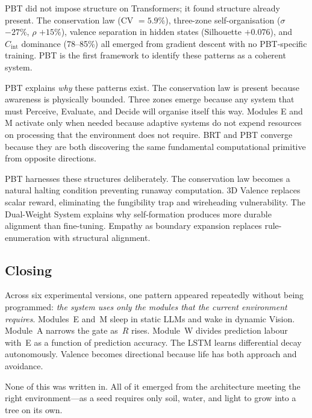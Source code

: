 \documentclass[12pt,a4paper]{article}
\newcommand{\Cint}{C_{\mathrm{int}}}
\newcommand{\pp}[1]{\textbf{#1}}
\begin{document}
\begin{description}[leftmargin=1.4em]
  \item[\pp{Layer~1 --- Reveal:}]
    PBT did not impose structure on Transformers; it found structure already
    present. The conservation law (CV $= 5.9\%$), three-zone
    self-organisation ($\sigma$ $-27\%$, $\rho$ $+15\%$), valence separation
    in hidden states (Silhouette $+0.076$), and $\Cint$ dominance (78--85\%)
    all emerged from gradient descent with no PBT-specific training. PBT is
    the first framework to identify these patterns as a coherent system.
  \item[\pp{Layer~2 --- Interpret:}]
    PBT explains \emph{why} these patterns exist. The conservation law is
    present because awareness is physically bounded. Three zones emerge because
    any system that must Perceive, Evaluate, and Decide will organise itself
    this way. Modules E and M activate only when needed because adaptive
    systems do not expend resources on processing that the environment does not
    require. BRT and PBT converge because they are both discovering the same
    fundamental computational primitive from opposite directions.
  \item[\pp{Layer~3 --- Control:}]
    PBT harnesses these structures deliberately. The conservation law becomes
    a natural halting condition preventing runaway computation. 3D Valence
    replaces scalar reward, eliminating the fungibility trap and wireheading
    vulnerability. The Dual-Weight System explains why self-formation produces
    more durable alignment than fine-tuning. Empathy as boundary expansion
    replaces rule-enumeration with structural alignment.
\end{description}

\subsection{Closing}

Across six experimental versions, one pattern appeared repeatedly without being
programmed: \emph{the system uses only the modules that the current environment
requires}. Modules~E and~M sleep in static LLMs and wake in dynamic Vision.
Module~A narrows the gate as~$R$ rises. Module~W divides prediction labour
with~E as a function of prediction accuracy. The LSTM learns differential
decay autonomously. Valence becomes directional because life has both approach
and avoidance.

None of this was written in. All of it emerged from the architecture meeting
the right environment---as a seed requires only soil, water, and light to grow
into a tree on its own.
\end{document}
